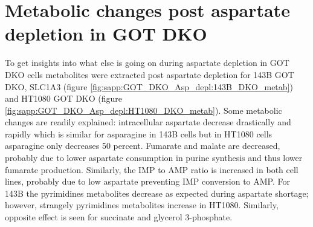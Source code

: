 \FloatBarrier
\section{Metabolic changes post aspartate depletion in GOT DKO}
To get insights into what else is going on during aspartate depletion in GOT DKO cells metabolites were extracted post aspartate depletion for 143B GOT DKO, SLC1A3 (figure \ref{fig:sapp:GOT_DKO_Asp_depl:143B_DKO_metab}) and HT1080 GOT DKO (figure \ref{fig:sapp:GOT_DKO_Asp_depl:HT1080_DKO_metab}).
Some metabolic changes are readily explained: intracellular aspartate decrease drastically and rapidly which is similar for asparagine in 143B cells but in HT1080 cells asparagine only decreases 50 percent.
Fumarate and malate are decreased, probably due to lower aspartate consumption in purine synthesis and thus lower fumarate production.
Similarly, the IMP to AMP ratio is increased in both cell lines, probably due to low aspartate preventing IMP conversion to AMP.
For 143B the pyrimidines metabolites decrease as expected during aspartate shortage; however, strangely pyrimidines metabolites increase in HT1080.
Similarly, opposite effect is seen for succinate and glycerol 3-phosphate.

